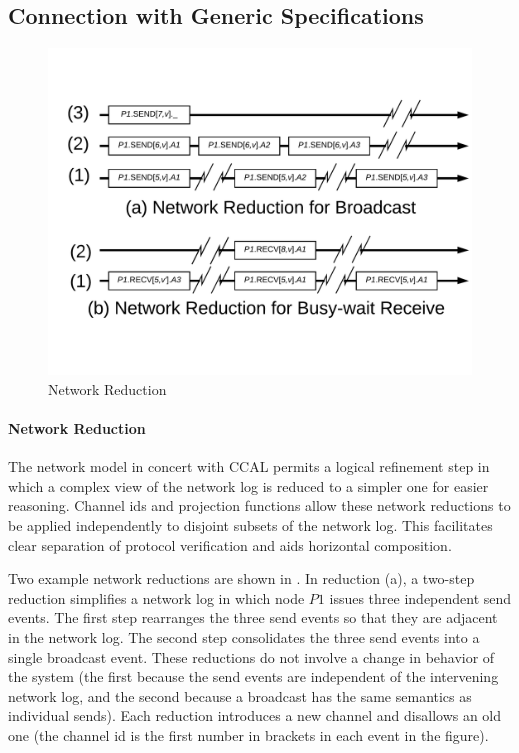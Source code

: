 \subsection{Connection with Generic Specifications}
\label{subsec:connection}

\begin{figure}
\begin{center}
\includegraphics[scale=0.3]{figs/witnesspassing/network_reduction.pdf}
\end{center}
\vspace{-1em}
\caption{Network Reduction}
\label{fig:network-reduction}
\vspace{-1em}
\end{figure}

\paragraph{Network Reduction}
The network model in concert with CCAL permits a logical refinement step in
which a complex view of the network log is reduced to a simpler one for easier
reasoning. Channel ids and projection functions allow these network
reductions to be applied independently to disjoint subsets of the network log.
This facilitates clear separation of protocol verification and aids
horizontal composition.

Two example network reductions are shown in . In
reduction (a), a two-step reduction simplifies a network log in which node $P1$
issues three independent send events. The first step rearranges the three send
events so that they are adjacent in the network log. The second step
consolidates the three send events into a single broadcast event. These
reductions do not involve a change in behavior of the system (the first because
the send events are independent of the intervening network log, and the second
because a broadcast has the same semantics as individual sends). Each reduction
introduces a new channel and disallows an old one (the channel id is the first
number in brackets in each event in the figure).


